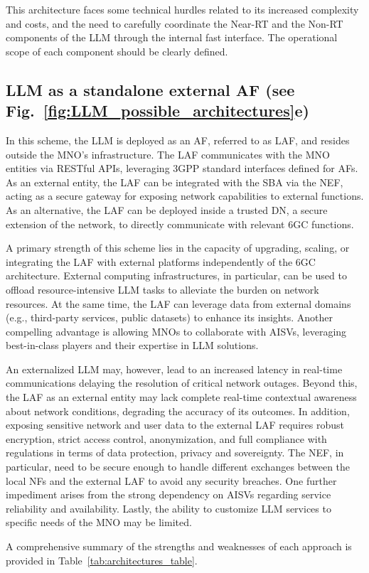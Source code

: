 This architecture faces some technical hurdles related to its increased complexity and costs, and the need to carefully coordinate the \gls{Near-RT} and the \gls{Non-RT} components of the \gls{LLM} through the internal fast interface. The operational scope of each component should be clearly defined.
\subsection{\gls{LLM} as a standalone external \gls{AF} (see Fig.~\ref{fig:LLM_possible_architectures}e)}
\label{subsec:external_llm}
In this scheme, the \gls{LLM} is deployed as an \gls{AF}, referred to as \gls{LAF}, and resides outside the \gls{MNO}'s infrastructure. The \gls{LAF} communicates with the \gls{MNO} entities via \gls{RESTful} APIs, leveraging \gls{3GPP} standard interfaces defined for \glspl{AF}. As an external entity, the \gls{LAF} can be integrated with the \gls{SBA} via the \gls{NEF}, acting as a secure gateway for exposing network capabilities to external functions. As an alternative, the \gls{LAF} can be deployed inside a trusted \gls{DN}, a secure extension of the network, to directly communicate with relevant \gls{6GC} functions.

A primary strength of this scheme lies in the capacity of upgrading, scaling, or integrating the \gls{LAF} with external platforms independently of the \gls{6GC} architecture. External computing infrastructures, in particular, can be used to offload resource-intensive \gls{LLM} tasks to alleviate the burden on network resources. At the same time, the \gls{LAF} can leverage data from external domains (e.g., third-party services, public datasets) to enhance its insights. Another compelling advantage is allowing \glspl{MNO} to collaborate with \glspl{AISV}, leveraging best-in-class players and their expertise in \gls{LLM} solutions.

An externalized \gls{LLM} may, however, lead to an increased latency in real-time communications delaying the resolution of critical network outages. Beyond this, the \gls{LAF} as an external entity may lack complete real-time contextual awareness about network conditions, degrading the accuracy of its outcomes. In addition, exposing sensitive network and user data to the external \gls{LAF} requires robust encryption, strict access control, anonymization, and full compliance with regulations in terms of data protection, privacy and sovereignty. The \gls{NEF}, in particular, need to be secure enough to handle different exchanges between the local \glspl{NF} and the external \gls{LAF} to avoid any security breaches. One further impediment arises from the strong dependency on \glspl{AISV} regarding service reliability and availability. Lastly, the ability to customize \gls{LLM} services to specific needs of the \gls{MNO} may be limited.


A comprehensive summary of the strengths and weaknesses of each approach is provided in Table~\ref{tab:architectures_table}.


